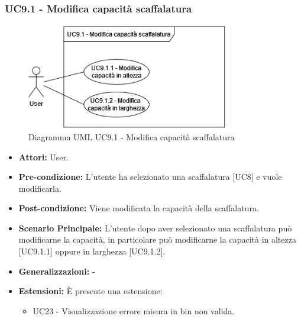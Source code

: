 \subsubsection{UC9.1 - Modifica capacità scaffalatura}
\begin{figure}[H]
  \centering
  \includegraphics[width=0.8\textwidth]{UC_diagrams_1-10/UC9.1.drawio.png}
   \caption{Diagramma UML UC9.1 - Modifica capacità scaffalatura}
\end{figure}
\begin{itemize}
    \item \textbf{Attori:} User.
    \item \textbf{Pre-condizione:}  L'utente ha selezionato una scaffalatura [UC8] e vuole modificarla.
    \item \textbf{Post-condizione:} Viene modificata la capacità della scaffalatura.
    \item \textbf{Scenario Principale:} L'utente dopo aver selezionato una scaffalatura può modificarne la capacità, in particolare può modificarne la capacità in altezza [UC9.1.1] oppure in larghezza [UC9.1.2].
    \item \textbf{Generalizzazioni:} -
    \item \textbf{Estensioni:} È presente una estensione:
    \begin{itemize}
        \item UC23 - Visualizzazione errore misura in bin non valida.
    \end{itemize}
\end{itemize}


